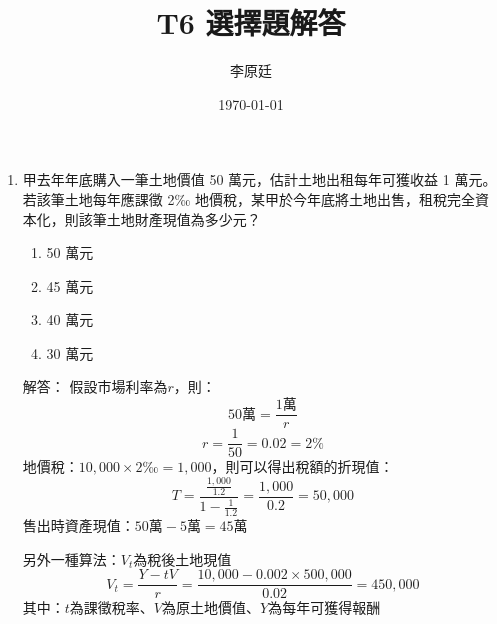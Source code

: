 \documentclass[12pt, a4paper]{article}
\begin{document}
\title{T6 選擇題解答} %
\author{李原廷} %
\date{\today} %

\maketitle



\begin{enumerate}

    \item 甲去年年底購入一筆土地價值 50 萬元，估計土地出租每年可獲收益 1 萬元。若該筆土地每年應課徵 2‰ 地價稅，某甲於今年底將土地出售，租稅完全資本化，則該筆土地財產現值為多少元？
    \begin{enumerate}[label=\Alph*.]
        \item 50 萬元
        \item 45 萬元
        \item 40 萬元
        \item 30 萬元
    \end{enumerate}
    解答：
    假設市場利率為$r$，則：
    \[
    50\text{萬} = \frac{1\text{萬}}{r}
    \]
    \[
    r = \frac{1}{50} = 0.02 = 2\%
    \]
    地價稅：$10,000\times 2‰ = 1,000$，則可以得出稅額的折現值：
    \[
    T = \frac{\frac{1,000}{1.2}}{1-\frac{1}{1.2}} = \frac{1,000}{0.2} = 50,000
    \]
    售出時資產現值：$50\text{萬} -5\text{萬} = 45\text{萬}$

    另外一種算法：$V_t$為稅後土地現值
    \[
    V_t = \frac{Y-tV}{r}= \frac{10,000 - 0.002\times 500,000}{0.02} = 450,000
    \]
    其中：$t$為課徵稅率、$V$為原土地價值、$Y$為每年可獲得報酬


\end{enumerate}
\end{document}
